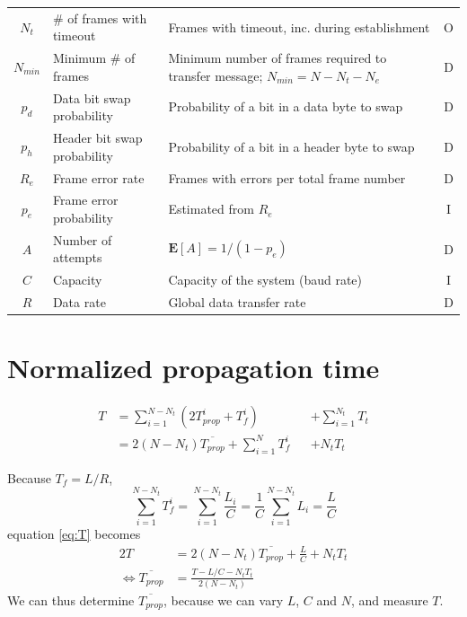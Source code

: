 \documentclass[a4paper, 11pt]{report}
\newcommand\expected[1]{\mathbf{E}[#1]}
\begin{document}
\begin{center}
\begin{tabular}{c | l | p{80mm} | c}
		$N_t$            & \# of frames with timeout   & Frames with timeout, inc. during establishment                                     & O   \\
		$N_{min}$        & Minimum \# of frames        & Minimum number of frames required to transfer message; $N_{min} = N-N_t-N_e$       & D   \\
		$p_d$            & Data bit swap probability   & Probability of a bit in a data byte to swap                                        & D   \\
		$p_h$            & Header bit swap probability & Probability of a bit in a header byte to swap                                      & D   \\
		$R_e$            & Frame error rate            & Frames with errors per total frame number                                          & D   \\
		$p_e$            & Frame error probability     & Estimated from $R_e$                                                               & I   \\
		$A$              & Number of attempts          & $\expected{A} = 1/(1-p_e)$                                                         & D   \\
		$C$              & Capacity                    & Capacity of the system (baud rate)                                                 & I   \\
		$R$              & Data rate                   & Global data transfer rate                                                          & D   \\
		\hline \hline
	\end{tabular}
\end{center}

\section{Normalized propagation time}

\begin{equation} \label{eq:T}
\begin{alignedat}{2}
	T & = \sum_{i=1}^{N-N_t}{(2T_{prop}^i + T_f^i)} && + \sum_{i=1}^{N_t}{T_t} \\
	  & = 2 (N-N_t) \overline{T_{prop}} + \sum_{i=1}^{N}{T_f^i} && + N_t T_t
\end{alignedat}
\end{equation}

Because $T_f = L/R$,
\begin{equation} \label{eq:Tfsum}
	\sum_{i=1}^{N-N_t}{T_f^i} = \sum_{i=1}^{N-N_t}{\frac{L_i}{C}} = \frac{1}{C} \sum_{i=1}^{N-N_t}{L_i} = \frac{L}{C}
\end{equation}
equation \ref{eq:T} becomes
\begin{alignat}{2} \label{eq:T2}
	T & = 2 (N-N_t) \overline{T_{prop}} + \frac{L}{C} + N_t T_t \\
	\iff \overline{T_{prop}} & = \frac{T - L/C - N_t T_t}{2 (N-N_t)}
\end{alignat}
We can thus determine $\overline{T_{prop}}$, because we can vary $L$, $C$ and $N$, and measure $T$.
\end{document}
